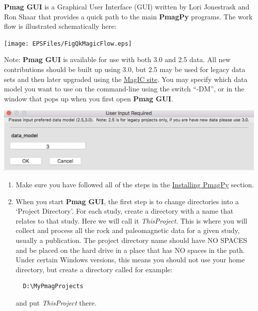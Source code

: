 \documentclass[11pt]{book}
\begin{document}
{{\bf Pmag GUI} is a Graphical User Interface (GUI) written by Lori Jonestrask and Ron Shaar  that provides a quick path to the main {\bf PmagPy} programs. The work flow is illustrated schematically here:

\texttt{[image: EPSFiles/FigQkMagicFlow.eps]}

Note: {\bf Pmag GUI} is available for use with both 3.0 and 2.5 data.  All new contributions should be built up using 3.0, but 2.5 may be used for legacy data sets and then later upgraded using the \href{https://www.earthref.org/MagIC/upgrade}{MagIC site}.  You may specify which data model you want to use on the command-line using the switch ``-DM'', or in the window that pops up when you first open {\bf Pmag GUI}.

\includegraphics[width=6in]{EPSFiles/PmagGUI_choose_data_model.eps}

\begin{enumerate}
\item Make sure you have followed all of the steps in the \href{#quick_start}{Installing PmagPy} section.


\item  When you start {\bf Pmag GUI}, the first step is to change directories into a  `Project Directory'. For each study, create a directory with a name that relates to that study. Here we will call it {\it ThisProject}.  This is where you will collect and process all the rock and paleomagnetic data for a given study, usually a publication. The project directory name should have NO SPACES and be placed on the hard drive in a place that has NO spaces in the path. Under certain Windows versions, this means you should not use your home directory, but create a directory called for example:\begin{verbatim}
  D:\MyPmagProjects\end{verbatim} and put {\it ThisProject} there.
%
%
%



\end{enumerate}}
\end{document}
